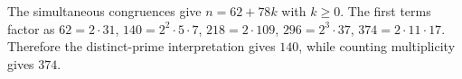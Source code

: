 The simultaneous congruences give $n=62+78k$ with $k\ge0$. The first terms factor as $62=2\cdot31$, $140=2^2\cdot5\cdot7$, $218=2\cdot109$, $296=2^3\cdot37$, $374=2\cdot11\cdot17$. Therefore the distinct-prime interpretation gives $\boxed{140}$, while counting multiplicity gives $\boxed{374}$.
